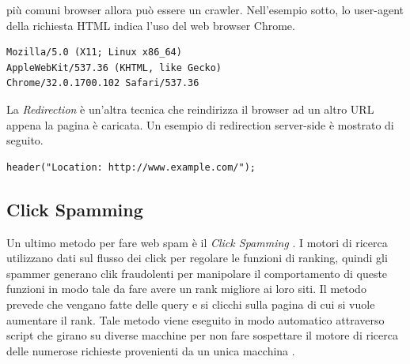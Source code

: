 più comuni browser allora può essere un crawler. Nell'esempio sotto, lo user-agent della richiesta HTML indica l'uso del web browser Chrome.
\begin{lstlisting}[frame=trbl,postbreak=\space, breakindent=5pt, breaklines]
Mozilla/5.0 (X11; Linux x86_64) 
AppleWebKit/537.36 (KHTML, like Gecko) 
Chrome/32.0.1700.102 Safari/537.36
\end{lstlisting}
La \textit{Redirection} è un'altra tecnica che reindirizza il browser ad un altro URL appena la pagina è caricata. Un esempio di redirection server-side è mostrato di seguito.
\begin{lstlisting}[frame=trbl,postbreak=\space, breakindent=5pt, breaklines]
header("Location: http://www.example.com/");
\end{lstlisting}
\subsection{Click Spamming}
Un ultimo metodo per fare web spam è il \textit{Click Spamming} \cite{Spirin:2012:SWS:2207243.2207252}. I motori di ricerca utilizzano dati sul flusso dei click per regolare le funzioni di ranking, quindi  gli spammer generano clik fraudolenti per manipolare il comportamento di queste funzioni in modo tale da fare avere un rank migliore ai loro siti. Il metodo prevede che vengano fatte delle query e si clicchi sulla pagina di cui si vuole aumentare il rank. Tale metodo viene eseguito in modo automatico attraverso script che girano su diverse macchine per non fare sospettare il motore di ricerca delle numerose richieste provenienti da un unica macchina \cite{Spirin:2012:SWS:2207243.2207252}.


